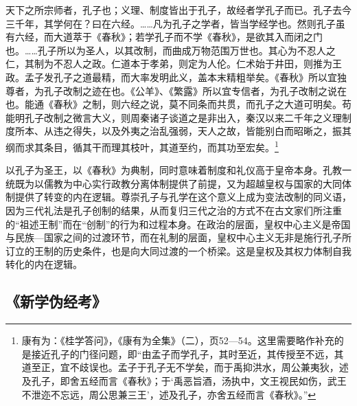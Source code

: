 \documentclass[a4paper, 12pt, openright]{ctexbook}
\renewenvironment{quote}
  {\list{}{\rightmargin2\ccwd \leftmargin2\ccwd \itemindent=2\ccwd \listparindent=2\ccwd}%
   \item\relax\small\kaishu\color{black}}
  {\endlist}
\begin{document}
\begin{quote}
天下之所宗师者，孔子也；义理、制度皆出于孔子，故经者学孔子而已。孔子去今三千年，其学何在？曰在六经。……凡为孔子之学者，皆当学经学也。然则孔子虽有六经，而大道萃于《春秋》；若学孔子而不学《春秋》，是欲其入而闭之门也。……孔子所以为圣人，以其改制，而曲成万物范围万世也。其心为不忍人之仁，其制为不忍人之政。仁道本于孝弟，则定为人伦。仁术始于井田，则推为王政。孟子发孔子之道最精，而大率发明此义，盖本末精粗举矣。《春秋》所以宜独尊者，为孔子改制之迹在也。《公羊》、《繁露》所以宜专信者，为孔子改制之说在也。能通《春秋》之制，则六经之说，莫不同条而共贯，而孔子之大道可明矣。苟能明孔子改制之微言大义，则周秦诸子谈道之是非出入，秦汉以来二千年之义理制度所本、从违之得失，以及外夷之治乱强弱，天人之故，皆能别白而昭晰之，振其纲而求其条目，循其干而理其枝叶，其道至约，而其功至宏矣。\footnote{康有为：《桂学答问》，《康有为全集》（二），页52—54。这里需要略作补充的是接近孔子的门径问题，即“由孟子而学孔子，其时至近，其传授至不远，其道至正，宜不歧误也。孟子于孔子无不学矣，而于禹抑洪水，周公兼夷狄，述及孔子，即舍五经而言《春秋》；于‘禹恶旨酒，汤执中，文王视民如伤，武王不泄迩不忘远，周公思兼三王’，述及孔子，亦舍五经而言《春秋》。”}
\end{quote}

以孔子为圣王，以《春秋》为典制，同时意味着制度和礼仪高于皇帝本身。孔教一统既为以儒教为中心实行政教分离体制提供了前提，又为超越皇权与国家的大同体制提供了转变的内在逻辑。尊崇孔子与孔学在这个意义上成为变法改制的同义语，因为三代礼法是孔子创制的结果，从而复归三代之治的方式不在古文家们所注重的“祖述王制”而在“创制”的行为和过程本身。在政治的层面，皇权中心主义是帝国与民族—国家之间的过渡环节，而在礼制的层面，皇权中心主义无非是施行孔子所订立的王制的历史条件，也是向大同过渡的一个桥梁。这是皇权及其权力体制自我转化的内在逻辑。

\subsection{《新学伪经考》}
\end{document}
